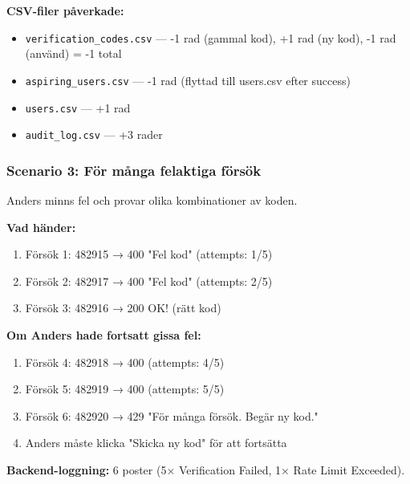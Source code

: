 \documentclass[12pt,a4paper]{article}
\begin{document}
\textbf{CSV-filer påverkade:}
\begin{itemize}[noitemsep]
  \item \texttt{verification\_codes.csv} — -1 rad (gammal kod), +1 rad (ny kod), -1 rad (använd) = -1 total
  \item \texttt{aspiring\_users.csv} — -1 rad (flyttad till users.csv efter success)
  \item \texttt{users.csv} — +1 rad
  \item \texttt{audit\_log.csv} — +3 rader
\end{itemize}

\subsubsection{Scenario 3: För många felaktiga försök}
Anders minns fel och provar olika kombinationer av koden.

\textbf{Vad händer:}
\begin{enumerate}[noitemsep]
  \item Försök 1: 482915 → 400 "Fel kod" (attempts: 1/5)
  \item Försök 2: 482917 → 400 "Fel kod" (attempts: 2/5)
  \item Försök 3: 482916 → 200 OK! (rätt kod)
\end{enumerate}

\textbf{Om Anders hade fortsatt gissa fel:}
\begin{enumerate}[noitemsep]
  \item Försök 4: 482918 → 400 (attempts: 4/5)
  \item Försök 5: 482919 → 400 (attempts: 5/5)
  \item Försök 6: 482920 → 429 "För många försök. Begär ny kod."
  \item Anders måste klicka "Skicka ny kod" för att fortsätta
\end{enumerate}

\textbf{Backend-loggning:} 6 poster (5× Verification Failed, 1× Rate Limit Exceeded).
\end{document}
